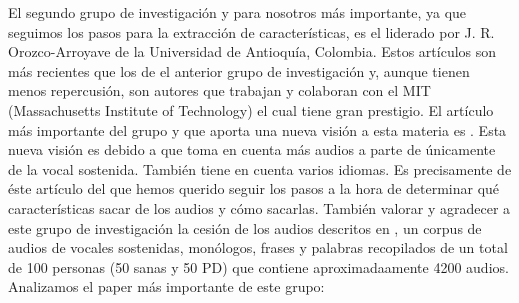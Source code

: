 El segundo grupo de investigación y para nosotros más importante, ya que seguimos los pasos para la extracción de características, es el liderado por J. R. Orozco-Arroyave de la Universidad de Antioquía, Colombia. Estos artículos son más recientes que los de el anterior grupo de investigación y, aunque tienen menos repercusión, son autores que trabajan y colaboran con el MIT (Massachusetts Institute of Technology) el cual tiene gran prestigio. El artículo más importante del grupo y que aporta una nueva visión a esta materia es \cite{Orz2016}. Esta nueva visión es debido a que toma en cuenta más audios a parte de únicamente de la vocal sostenida. También tiene en cuenta varios idiomas. Es precisamente de éste artículo del que hemos querido seguir los pasos a la hora de determinar qué características sacar de los audios y cómo sacarlas. También valorar y agradecer a este grupo de investigación la cesión de los audios descritos en \cite{OrzCorpus}, un corpus de audios de vocales sostenidas, monólogos, frases y palabras recopilados de un total de 100 personas (50 sanas y 50 PD) que contiene aproximadaamente 4200 audios. Analizamos el paper más importante de este grupo:
